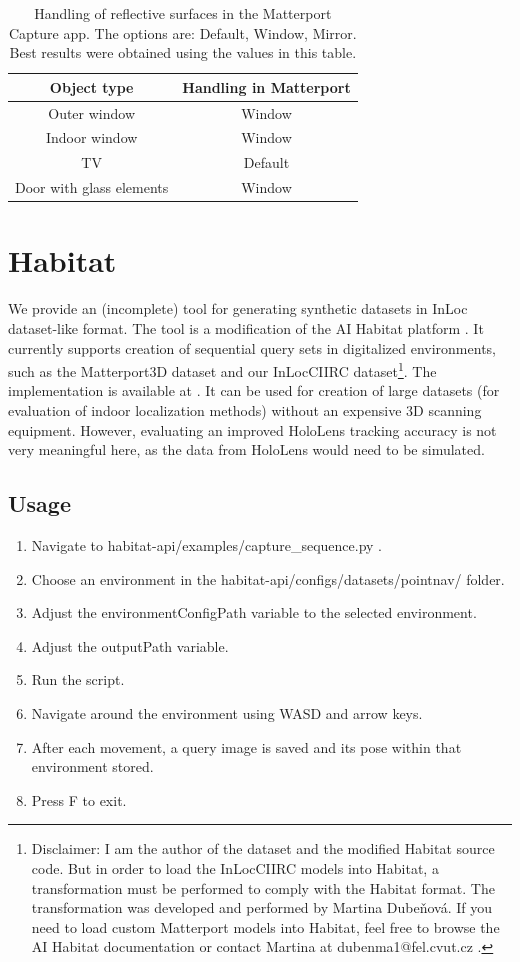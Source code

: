 \documentclass[twoside]{ctuthesis}
\makeatletter
\theoremstyle{plain}
\theoremstyle{definition}
\theoremstyle{note}
\newcommand{\code}[1]{{\ttfamily #1%
}}
\newcommand{\InLocCIIRCDatasetModelsInHabitat}{Disclaimer: I am the author of the dataset and the modified Habitat source code. But in order to load the InLocCIIRC models into Habitat, a transformation must be performed to comply with the Habitat format. The transformation was developed and performed by Martina Dubeňová. If you need to load custom Matterport models into Habitat, feel free to browse the AI Habitat documentation or contact Martina at \code{dubenma1@fel.cvut.cz}.}
\makeatother
\begin{document}
\begin{table}[htb!]
	\centering
	\begin{tabular}{|c|c|}
		\hline
		\bfseries Object type & \bfseries Handling in Matterport \\
		\hline
		\hline
		Outer window & Window \\
		\hline
		Indoor window & Window \\
		\hline
		TV & Default \\
		\hline
		Door with glass elements & Window \\
		\hline
	\end{tabular}
	\caption[Handling of reflective surfaces]{Handling of reflective surfaces in the Matterport Capture app. The options are: Default, Window, Mirror. Best results were obtained using the values in this table.}
	\label{tab:matterport-reflective-surfaces}
\end{table}

\section{Habitat}
We provide an (incomplete) tool for generating synthetic datasets in InLoc dataset-like format. The tool is a modification of the AI Habitat platform \cite{habitat19iccv}. It currently supports creation of sequential query sets in digitalized environments, such as the Matterport3D dataset \cite{Matterport3D} and our InLocCIIRC dataset\footnote{\InLocCIIRCDatasetModelsInHabitat}. The implementation is available at \cite{HabitatFork}. It can be used for creation of large datasets (for evaluation of indoor localization methods) without an expensive 3D scanning equipment. However, evaluating an improved HoloLens tracking accuracy is not very meaningful here, as the data from HoloLens would need to be simulated.

\subsection{Usage}
\begin{enumerate}
	\item Navigate to \code{habitat-api/examples/capture\_sequence.py}.
	\item Choose an environment in the \code{habitat-api/configs/datasets/pointnav/} folder.
	\item Adjust the \code{environmentConfigPath} variable to the selected environment.
	\item Adjust the \code{outputPath} variable.
	\item Run the script.
	\item Navigate around the environment using \code{WASD} and arrow keys.
	\item After each movement, a query image is saved and its pose within that environment stored.
	\item Press \code{F} to exit.
\end{enumerate}
\end{document}
